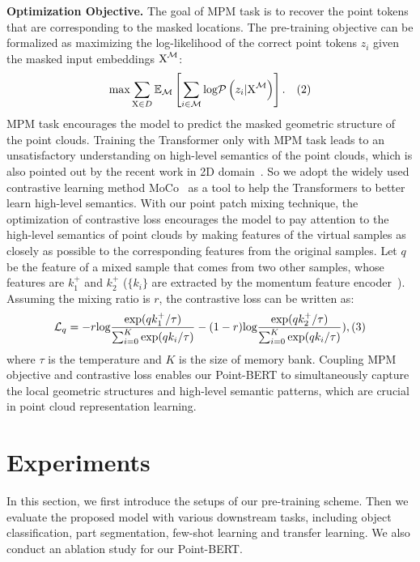 \documentclass[10pt,twocolumn,letterpaper]{article}
\newcommand{\paragrapha}[2][5pt]{\vspace{#1}\noindent\textbf{#2}}
\begin{document}
\paragrapha{Optimization Objective. } The goal of MPM task is to recover the point tokens that are corresponding to the masked locations. The pre-training objective can be formalized as maximizing the log-likelihood of the correct point tokens $z_{i}$ given the masked input embeddings $\textup{X}^{\mathcal{M}}$:
\small\begin{equation}
	\textup{max}\sum_{\textup{X}\in D}^{}\mathbb{E}_{\mathcal{M}}\left [   \sum_{i\in \mathcal{M}  }^{} \textup{log} \mathcal{P}\left (  z_{i} | \textup{X}^{\mathcal{M}}\right ) \right ].  \quad    (2)
	\nonumber
\end{equation}\normalsize
MPM task encourages the model to predict the masked geometric structure of the point clouds.  Training the Transformer only with MPM task leads to an unsatisfactory understanding on high-level semantics of the point clouds, which is also pointed out by the recent work in 2D domain~\cite{ibot}. So we adopt the widely used contrastive learning method MoCo~\cite{moco} as a tool to help the Transformers to better learn high-level semantics. With our point patch mixing technique, the optimization of contrastive loss encourages the model to pay attention to the high-level semantics of point clouds by making features of the virtual samples as closely as possible to the corresponding features from the original samples. Let $q$ be the feature of a mixed sample that comes from two other samples, whose features are $k^{+}_1$ and $k^{+}_2$ ($\{k_i\}$ are extracted by the momentum feature encoder~\cite{moco}). Assuming the mixing ratio is $r$, the contrastive loss can be written as:
\small\begin{equation}
	\mathcal{L}_q = -r \textup{log} \frac{\textup{exp}(qk^{+}_1/ \tau)}{\sum_{i=0}^K \textup{exp}(qk_i/\tau)} - (1-r) \textup{log} \frac{\textup{exp}(qk^{+}_2/ \tau)}{\sum_{i=0}^K \textup{exp}(qk_i/\tau)}),    (3)
	\nonumber
\end{equation}\normalsize
where $\tau$ is the temperature and $K$ is the size of memory bank. Coupling MPM objective and contrastive loss enables our Point-BERT to simultaneously capture the local geometric structures and high-level semantic patterns, which are crucial in point cloud representation learning. 

	
\section{Experiments}
In this section, we first introduce the setups of our pre-training scheme. Then we evaluate the proposed model with various downstream tasks, including object classification, part segmentation, few-shot learning and transfer learning. We also conduct an ablation study for our Point-BERT. 
\end{document}
